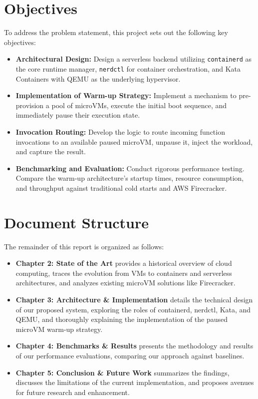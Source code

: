 \documentclass[12pt,a4paper]{report}
\begin{document}
\section{Objectives}
To address the problem statement, this project sets out the following key objectives:
\begin{itemize}
    \item \textbf{Architectural Design:} Design a serverless backend utilizing \texttt{containerd} as the core runtime manager, \texttt{nerdctl} for container orchestration, and Kata Containers with QEMU as the underlying hypervisor.
    \item \textbf{Implementation of Warm-up Strategy:} Implement a mechanism to pre-provision a pool of microVMs, execute the initial boot sequence, and immediately pause their execution state.
    \item \textbf{Invocation Routing:} Develop the logic to route incoming function invocations to an available paused microVM, unpause it, inject the workload, and capture the result.
    \item \textbf{Benchmarking and Evaluation:} Conduct rigorous performance testing. Compare the warm-up architecture's startup times, resource consumption, and throughput against traditional cold starts and AWS Firecracker.
\end{itemize}

\section{Document Structure}
The remainder of this report is organized as follows:
\begin{itemize}
    \item \textbf{Chapter 2: State of the Art} provides a historical overview of cloud computing, traces the evolution from VMs to containers and serverless architectures, and analyzes existing microVM solutions like Firecracker.
    \item \textbf{Chapter 3: Architecture \& Implementation} details the technical design of our proposed system, exploring the roles of containerd, nerdctl, Kata, and QEMU, and thoroughly explaining the implementation of the paused microVM warm-up strategy.
    \item \textbf{Chapter 4: Benchmarks \& Results} presents the methodology and results of our performance evaluations, comparing our approach against baselines.
    \item \textbf{Chapter 5: Conclusion \& Future Work} summarizes the findings, discusses the limitations of the current implementation, and proposes avenues for future research and enhancement.
\end{itemize}
\end{document}

